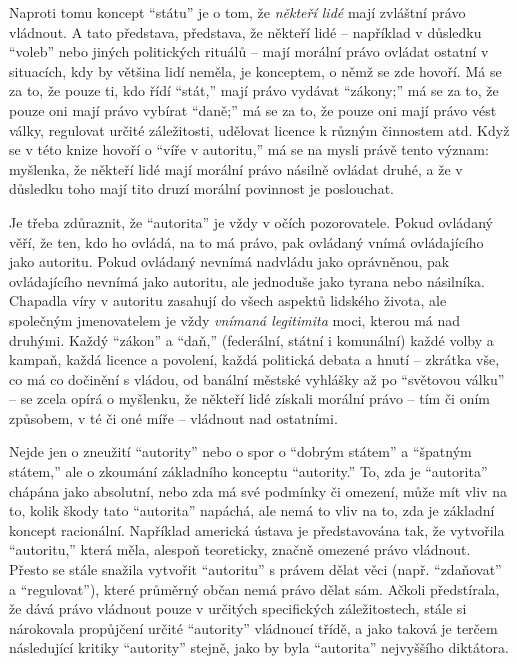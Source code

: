 \documentclass{book}
\begin{document}
Naproti tomu koncept \enquote{státu} je o tom, že \emph{někteří lidé} mají zvláštní právo vládnout. A tato představa, představa, že někteří lidé -- například v důsledku \enquote{voleb} nebo jiných politických rituálů -- mají morální právo ovládat ostatní v situacích, kdy by většina lidí neměla, je konceptem, o němž se zde hovoří. Má se za to, že pouze ti, kdo řídí \enquote{stát,} mají právo vydávat \enquote{zákony;} má se za to, že pouze oni mají právo vybírat \enquote{daně;} má se za to, že pouze oni mají právo vést války, regulovat určité záležitosti, udělovat licence k různým činnostem atd. Když se v této knize hovoří o \enquote{víře v autoritu,} má se na mysli právě tento význam: myšlenka, že někteří lidé mají morální právo násilně ovládat druhé, a že v důsledku toho mají tito druzí morální povinnost je poslouchat.

Je třeba zdůraznit, že \enquote{autorita} je vždy v očích pozorovatele. Pokud ovládaný věří, že ten, kdo ho ovládá, na to má právo, pak ovládaný vnímá ovládajícího jako autoritu. Pokud ovládaný nevnímá nadvládu jako oprávněnou, pak ovládajícího nevnímá jako autoritu, ale jednoduše jako tyrana nebo násilníka. Chapadla víry v autoritu zasahují do všech aspektů lidského života, ale společným jmenovatelem je vždy \emph{vnímaná legitimita} moci, kterou má nad druhými. Každý \enquote{zákon} a \enquote{daň,} (federální, státní i komunální) každé volby a kampaň, každá licence a povolení, každá politická debata a hnutí -- zkrátka vše, co má co dočinění s vládou, od banální městské vyhlášky až po \enquote{světovou válku} -- se zcela opírá o myšlenku, že někteří lidé získali morální právo -- tím či oním způsobem, v té či oné míře -- vládnout nad ostatními.

Nejde jen o zneužití \enquote{autority} nebo o spor o \enquote{dobrým státem} a \enquote{špatným státem,} ale o zkoumání základního konceptu \enquote{autority.} To, zda je \enquote{autorita} chápána jako absolutní, nebo zda má své podmínky či omezení, může mít vliv na to, kolik škody tato \enquote{autorita} napáchá, ale nemá to vliv na to, zda je základní koncept racionální. Například americká ústava je představována tak, že vytvořila \enquote{autoritu,} která měla, alespoň teoreticky, značně omezené právo vládnout. Přesto se stále snažila vytvořit \enquote{autoritu} s právem dělat věci (např. \enquote{zdaňovat} a \enquote{regulovat}), které průměrný občan nemá právo dělat sám. Ačkoli předstírala, že dává právo vládnout pouze v určitých specifických záležitostech, stále si nárokovala propůjčení určité \enquote{autority} vládnoucí třídě, a jako taková je terčem následující kritiky \enquote{autority} stejně, jako by byla \enquote{autorita} nejvyššího diktátora.
\end{document}
